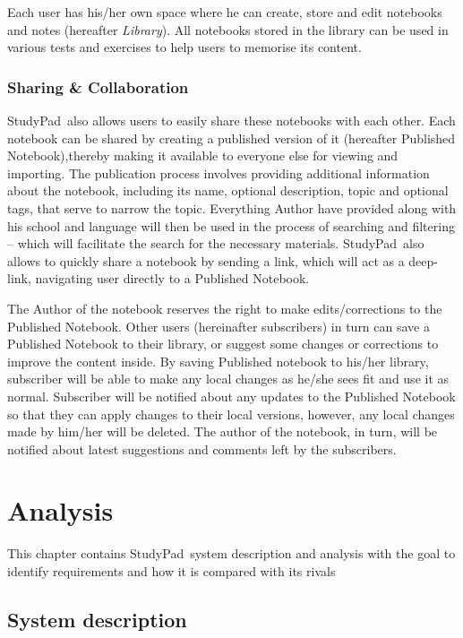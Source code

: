 \documentclass[thesis=B,english]{FITthesis}[2012/10/20]
\newcommand{\appname}{StudyPad}
\begin{document}
Each user has his/her own space where he can create, store and edit notebooks and notes (hereafter \textit{Library}). All notebooks stored in the library can be used in various tests and exercises to help users to memorise its content. 

\subsection{Sharing \& Collaboration }
\appname\ also allows users to easily share these notebooks with each other. Each notebook can be shared by creating a published version of it (hereafter Published Notebook),thereby making it available to everyone else for viewing and importing.
The publication process involves providing additional information about the notebook, including its name, optional description, topic and optional tags, that serve to narrow the topic. Everything Author have provided along with his school and language will then be used in the process of searching and filtering -- which will facilitate the search for the necessary materials. \appname\ also allows to quickly share a notebook by sending a link, which will act as a deep-link, navigating user directly to a Published Notebook.

The Author of the notebook reserves the right to make edits/corrections to the Published Notebook. Other users (hereinafter subscribers) in turn can save a Published Notebook to their library, or suggest some changes or corrections to improve the content inside. By saving Published notebook to his/her library, subscriber will be able to make any local changes as he/she sees fit and use it as normal. Subscriber will be notified about any updates to the Published Notebook so that they can apply changes to their local versions, however, any local changes made by him/her will be deleted. The author of the notebook, in turn, will be notified about latest suggestions and comments left by the subscribers.

\chapter{Analysis}
This chapter contains \appname\ system description and analysis with the goal to identify requirements and how it is compared with its rivals


\section{System description}
\end{document}
